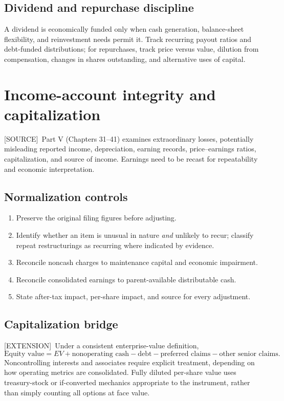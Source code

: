 \documentclass[11pt,letterpaper]{article}
\newcommand{\src}{\textsf{\color{sea}[SOURCE]}}
\newcommand{\ext}{\textsf{\color{gold}[EXTENSION]}}
\begin{document}
\subsection{Dividend and repurchase discipline}
A dividend is economically funded only when cash generation, balance-sheet flexibility, and reinvestment needs permit it. Track recurring payout ratios and debt-funded distributions; for repurchases, track price versus value, dilution from compensation, changes in shares outstanding, and alternative uses of capital.

\section{Income-account integrity and capitalization}
\src\ Part V (Chapters 31--41) examines extraordinary losses, potentially misleading reported income, depreciation, earning records, price--earnings ratios, capitalization, and source of income. Earnings need to be recast for repeatability and economic interpretation.

\subsection{Normalization controls}
\begin{enumerate}
\item Preserve the original filing figures before adjusting.
\item Identify whether an item is unusual in nature \emph{and} unlikely to recur; classify repeat restructurings as recurring where indicated by evidence.
\item Reconcile noncash charges to maintenance capital and economic impairment.
\item Reconcile consolidated earnings to parent-available distributable cash.
\item State after-tax impact, per-share impact, and source for every adjustment.
\end{enumerate}

\subsection{Capitalization bridge}
\ext\ Under a consistent enterprise-value definition,
\[
\text{Equity value}=EV+\text{nonoperating cash}-\text{debt}-\text{preferred claims}-\text{other senior claims}.
\]
Noncontrolling interests and associates require explicit treatment, depending on how operating metrics are consolidated. Fully diluted per-share value uses treasury-stock or if-converted mechanics appropriate to the instrument, rather than simply counting all options at face value.
\end{document}
